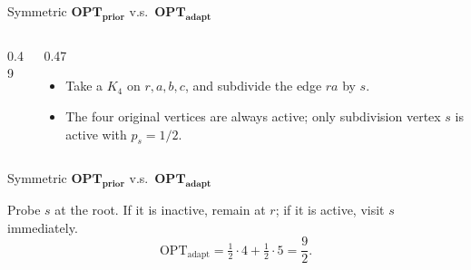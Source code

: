 \documentclass[aspectratio=169,12pt]{beamer}
\newcommand{\OPT}{\mathrm{OPT}}
\newcommand{\optadapt}{\OPT_{\mathrm{adapt}}}
\begin{document}
\begin{frame}{Symmetric \(\mathbf{OPT}_{\mathbf{prior}}\) v.s.\ \(\mathbf{OPT}_{\mathbf{adapt}}\)}
  \begin{columns}[T,onlytextwidth]
    \begin{column}{0.49\textwidth}
      \centering
      \resizebox{0.90\linewidth}{!}{\ThKFourSubdivision}
    \end{column}
    \begin{column}{0.47\textwidth}
      \vspace{0.38cm}
      \begin{itemize}\setlength{\itemsep}{0.58em}
        \item Take a  \(K_4\) on \(r,a,b,c\), and subdivide
          the edge \(ra\) by \(s\).
        \item The four original vertices are always active; only subdivision vertex \(s\) is
          active with \(p_s=1/2\).
      \end{itemize}
    \end{column}
  \end{columns}
\end{frame}

\begin{frame}{Symmetric \(\mathbf{OPT}_{\mathbf{prior}}\) v.s.\ \(\mathbf{OPT}_{\mathbf{adapt}}\)}
  \centering
  {\small\bfseries
    \par}
  \smallskip
  \resizebox{0.90\linewidth}{!}{\ThKFourOutcomes}

  \vspace{0.05cm}
      \small Probe \(s\) at the root. If it is inactive, remain at \(r\);
      if it is active, visit \(s\) immediately.
      \[
        \optadapt=\tfrac12\cdot4+\tfrac12\cdot5=\frac92.
      \]
\end{frame}
\end{document}
